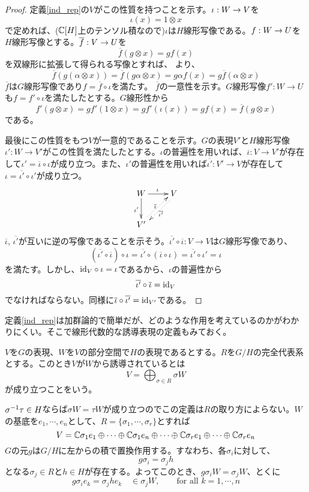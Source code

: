 \documentclass{ltjsreport}
\begin{document}
\begin{proof}
  定義\ref{ind_rep}の$V$がこの性質を持つことを示す。$\iota:W\rightarrow V$を
  \[
  \iota(x)=1\otimes x  
  \]
  で定めれば、($\mathbb{C}[H]$上のテンソル積なので)$\iota$は$H$線形写像である。$f:W\rightarrow U$を$H$線形写像とする。$\overline{f}:V\rightarrow U$を
  \[
  \overline{f}(g\otimes x)=gf(x)
  \]
  を双線形に拡張して得られる写像とすれば、
  より、
  \[
  \overline{f}(g(\alpha\otimes x))=\overline{f}(g\alpha\otimes x)=g\alpha f(x)  =g\overline{f}(\alpha\otimes x)
  \]
  $\overline{f}$は$G$線形写像であり$f=\overline{f}\circ \iota$を満たす。 $\overline{f}$の一意性を示す。$G$線形写像$f':W\rightarrow U$も$f=f'\circ \iota$を満たしたとする。$G$線形性から
  \[
  f'(g\otimes x)=gf'(1\otimes x)=gf'(\iota(x))=gf(x)=\overline{f}(g\otimes x)  
  \]
  である。

  最後にこの性質をもつ$V$が一意的であることを示す。$G$の表現$V'$と$H$線形写像$\iota':W\rightarrow V'$がこの性質を満たしたとする。$\iota$の普遍性を用いれば、$\overline{\iota}:V\rightarrow V'$が存在して$\iota'=\overline{\iota}\circ\iota$が成り立つ。また、$\iota'$の普遍性を用いれば$\overline{\iota'}:V'\rightarrow V$が存在して$\iota=\overline{\iota'}\circ \iota'$が成り立つ。
\[
\xymatrix{
  W \ar[r]^{\iota} \ar[d]_{\iota'}& 
  V \ar@<0.5ex>@{.>}[ld]_{\overline{\iota}} \\
  V' \ar@<0.5ex>@{.>}[ru]_{\overline{\iota'}}
  }
\]
  $\overline{\iota}$, $\overline{\iota'}$が互いに逆の写像であることを示そう。$\overline{\iota'}\circ\overline{\iota}:V\rightarrow V$は$G$線形写像であり、
  \[
  (\overline{\iota'}\circ\overline{\iota})\circ\iota=
  \overline{\iota'}\circ(\overline{\iota}\circ\iota)=
  \overline{\iota'}\circ \iota'=\iota
  \]
  を満たす。しかし、$\text{id}_{V}\circ \iota=\iota$であるから、$\iota$の普遍性から
  \[
  \overline{\iota'}\circ\overline{\iota}=\text{id}_{V}
  \]
  でなければならない。同様に$\overline{\iota}\circ\overline{\iota'}=\text{id}_{V'}$である。
\end{proof}

定義\ref{ind_rep}は加群論的で簡単だが、どのような作用を考えているのかがわかりにくい。そこで線形代数的な誘導表現の定義もみておく。

\begin{defin}\label{ind_rep_2}
  $V$を$G$の表現、$W$を$V$の部分空間で$H$の表現であるとする。$R$を$G/H$の完全代表系とする。このとき$V$が$W$から誘導されているとは
  \[
  V=\bigoplus_{\sigma\in R}\sigma W  
  \]
  が成り立つことをいう。
\end{defin}

$\sigma^{-1}\tau\in H$ならば$\sigma W=\tau W$が成り立つのでこの定義は$R$の取り方によらない。$W$の基底を$e_1,\cdots,e_n$として、$R=\{\sigma_1,\cdots,\sigma_r\}$とすれば
\[
V=
\mathbb{C}\sigma_1 e_1\oplus\cdots\oplus\mathbb{C}\sigma_1 e_n
\oplus\cdots\oplus
\mathbb{C}\sigma_r e_1\oplus\cdots\oplus\mathbb{C}\sigma_r e_n
\]
$G$の元$g$は$G/H$に左からの積で置換作用する。すなわち、各$\sigma_i$に対して、
\[
g\sigma_i=\sigma_j h  
\]
となる$\sigma_j\in R$と$h\in H$が存在する。よってこのとき、$g\sigma_iW=\sigma_jW$、とくに
\begin{equation}\label{ind_action}
  g\sigma_ie_k=\sigma_j he_k  \quad\in\sigma_jW,\qquad \text{for all $k=1,\cdots,n$}  
\end{equation}
\end{document}

